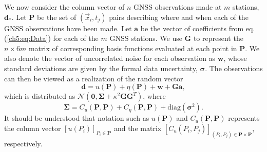 We now consider the column vector of $n$ GNSS observations made at $m$ stations, $\mathbf{d}_*$. Let $\mathbf{P}$ be the set of $(\vec{x}_i, t_j)$ pairs describing where and when each of the GNSS observations have been made. Let $\mathbf{a}$ be the vector of coefficients from eq. (\ref{ch5:eq:Data}) for each of the $m$ GNSS stations. We use $\mathbf{G}$ to represent the $n \times 6m$ matrix of corresponding basis functions evaluated at each point in $\mathbf{P}$. We  also denote the vector of uncorrelated noise for each observation as $\mathbf{w}$, whose standard deviations are given by the formal data uncertainty, $\mathbf{\sigma}$. The observations can then be viewed as a realization of the random vector
\begin{equation}
\mathbf{d} = u(\mathbf{P}) + \eta(\mathbf{P}) + \mathbf{w} + \mathbf{G}\mathbf{a},
\end{equation}
which is distributed as $\mathcal{N}(\mathbf{0},\mathbf{\Sigma} + \kappa^2\mathbf{G}\mathbf{G}^T)$, where
\begin{equation}\label{ch5:eq:Cd}
\mathbf{\Sigma} = C_u(\mathbf{P},\mathbf{P}) + C_\eta(\mathbf{P},\mathbf{P}) + 
              \mathrm{diag}\left(\mathbf{\sigma}^2\right).  
\end{equation}
It should be understood that notation such as $u(\mathbf{P})$ and $C_u(\mathbf{P},\mathbf{P})$ represents the column vector $[u(P_i)]_{P_i \in \mathbf{P}}$ and the matrix $[C_u(P_i,P_j)]_{(P_i,P_j) \in \mathbf{P} \times \mathbf{P}}$, respectively. 

